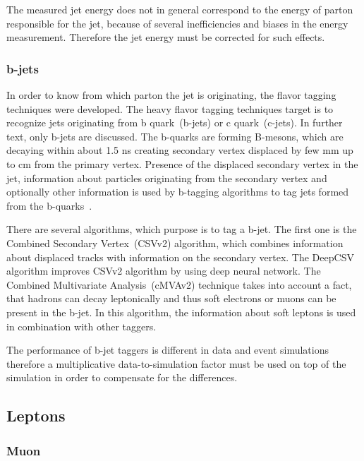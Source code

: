 The measured jet energy does not in general correspond to the energy of parton responsible for the jet, because of several inefficiencies and biases in the energy measurement. Therefore the jet energy must be corrected for such effects.

\subsubsection{b-jets}

In order to know from which parton the jet is originating, the flavor tagging techniques were developed. The heavy flavor tagging techniques target is to recognize jets originating from b quark~(b-jets) or c quark~(c-jets). In further text, only b-jets are discussed. The b-quarks are forming B-mesons, which are decaying within about 1.5 ns creating secondary vertex displaced by few mm up to cm from the primary vertex. Presence of the displaced secondary vertex in the jet, information about particles originating from the secondary vertex and optionally other information is used by b-tagging algorithms to tag jets formed from the b-quarks~\cite{Sirunyan:2017ezt}.

There are several algorithms, which purpose is to tag a b-jet. The first one is the Combined Secondary Vertex~(CSVv2) algorithm, which combines information about displaced tracks with information on the secondary vertex. The DeepCSV algorithm improves CSVv2 algorithm by using deep neural network. The Combined Multivariate Analysis~(cMVAv2) technique takes into account a fact, that hadrons can decay leptonically and thus soft electrons or muons can be present in the b-jet. In this algorithm, the information about soft leptons is used in combination with other taggers.

The performance of b-jet taggers is different in data and event simulations therefore a multiplicative data-to-simulation factor must be used on top of the simulation in order to compensate for the differences.

\subsection{Leptons}

\subsubsection{Muon}

